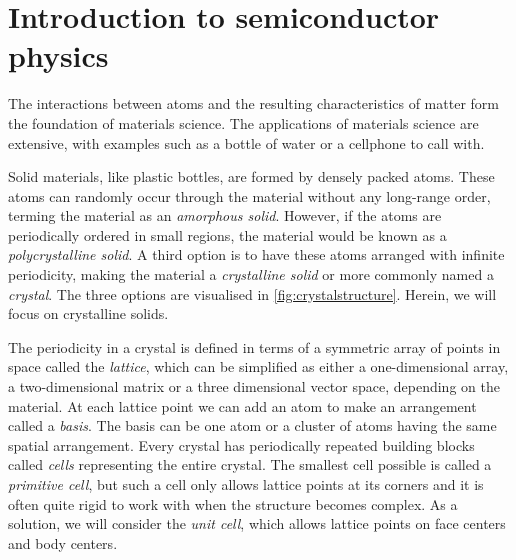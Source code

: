 \section{Introduction to semiconductor physics}

The interactions between atoms and the resulting characteristics of matter form the foundation of materials science. The applications of materials science are extensive, with examples such as a bottle of water or a cellphone to call with.



Solid materials, like plastic bottles, are formed by densely packed atoms. These atoms can randomly occur through the material without any long-range order, terming the material as an \textit{amorphous solid}. However, if the atoms are periodically ordered in small regions, the material would be known as a \textit{polycrystalline solid}. %
A third option is to have these atoms arranged with infinite periodicity, making the material a \textit{crystalline solid} or more commonly named a \textit{crystal}. The three options are visualised in \autoref{fig:crystalstructure}. Herein, we will focus on crystalline solids.

The periodicity in a crystal is defined in terms of a symmetric array of points in space called the \textit{lattice}, which can be simplified as either a one-dimensional array, a two-dimensional matrix or a three dimensional vector space, depending on the material. At each lattice point we can add an atom to make an arrangement called a \textit{basis}. The basis can be one atom or a cluster of atoms having the same spatial arrangement. Every crystal has periodically repeated building blocks called \textit{cells} representing the entire crystal. The smallest cell possible is called a \textit{primitive cell}, but such a cell only allows lattice points at its corners and it is often quite rigid to work with when the structure becomes complex. As a solution, we will consider the \textit{unit cell}, which allows lattice points on face centers and body centers.

